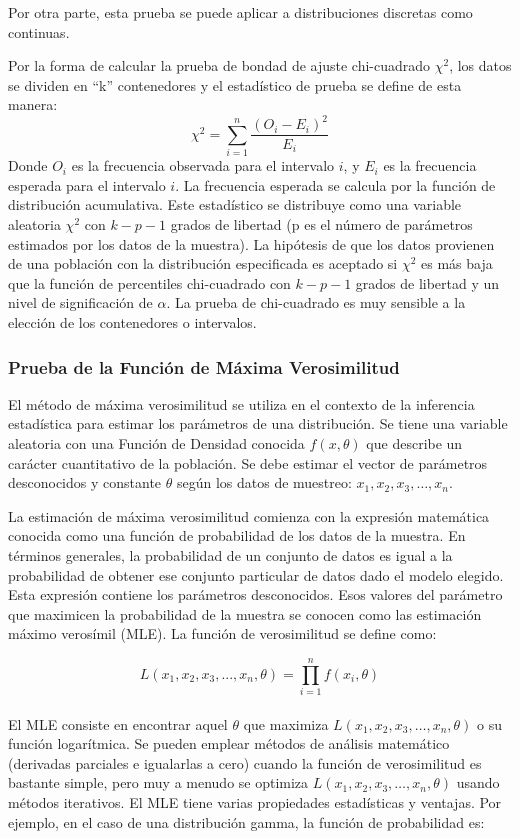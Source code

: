 \documentclass[10pt,]{article}
\begin{document}
Por otra parte, esta prueba se puede aplicar a distribuciones discretas
como continuas.

Por la forma de calcular la prueba de bondad de ajuste chi-cuadrado
\(\chi^2\), los datos se dividen en ``k'' contenedores y el estadístico
de prueba se define de esta manera:
\[\chi^2=\sum_{i=1}^{n}\frac{(O_i-E_i)^2}{E_i}\] Donde \(O_i\) es la
frecuencia observada para el intervalo \(i\), y \(E_i\) es la frecuencia
esperada para el intervalo \(i\). La frecuencia esperada se calcula por
la función de distribución acumulativa. Este estadístico se distribuye
como una variable aleatoria \(\chi^2\) con \(k-p-1\) grados de libertad
(p es el número de parámetros estimados por los datos de la muestra). La
hipótesis de que los datos provienen de una población con la
distribución especificada es aceptado si \(\chi^2\) es más baja que la
función de percentiles chi-cuadrado con \(k-p-1\) grados de libertad y
un nivel de significación de \(\alpha\). La prueba de chi-cuadrado es
muy sensible a la elección de los contenedores o intervalos.

\hypertarget{prueba-de-la-funcion-de-maxima-verosimilitud}{%
\subsubsection{Prueba de la Función de Máxima
Verosimilitud}\label{prueba-de-la-funcion-de-maxima-verosimilitud}}

El método de máxima verosimilitud se utiliza en el contexto de la
inferencia estadística para estimar los parámetros de una distribución.
Se tiene una variable aleatoria con una Función de Densidad conocida
\(f(x,\theta)\) que describe un carácter cuantitativo de la población.
Se debe estimar el vector de parámetros desconocidos y constante
\(\theta\) según los datos de muestreo: \(x_1,x_2,x_3,…,x_n\).

La estimación de máxima verosimilitud comienza con la expresión
matemática conocida como una función de probabilidad de los datos de la
muestra. En términos generales, la probabilidad de un conjunto de datos
es igual a la probabilidad de obtener ese conjunto particular de datos
dado el modelo elegido. Esta expresión contiene los parámetros
desconocidos. Esos valores del parámetro que maximicen la probabilidad
de la muestra se conocen como las estimación máximo verosímil (MLE). La
función de verosimilitud se define como:

\[L(x_1, x_2, x_3, ..., x_n, \theta)=\prod_{i=1}^{n}f(x_i, \theta)\]\\
El MLE consiste en encontrar aquel \(\theta\) que maximiza
\(L(x_1,x_2,x_3,…,x_n,\theta)\) o su función logarítmica. Se pueden
emplear métodos de análisis matemático (derivadas parciales e igualarlas
a cero) cuando la función de verosimilitud es bastante simple, pero muy
a menudo se optimiza \(L(x_1,x_2,x_3,…,x_n,\theta)\) usando métodos
iterativos. El MLE tiene varias propiedades estadísticas y ventajas. Por
ejemplo, en el caso de una distribución gamma, la función de
probabilidad es:
\end{document}
